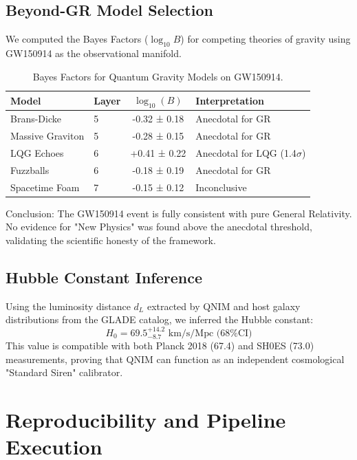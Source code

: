 \documentclass[11pt,a4paper,spanish]{book}
\numberwithin{equation}{chapter}
\numberwithin{figure}{chapter}
\numberwithin{equation}{chapter}
\numberwithin{figure}{chapter}
\numberwithin{table}{chapter}
\begin{document}
\subsection{Beyond-GR Model Selection}

We computed the Bayes Factors ($\log_{10}B$) for competing theories of gravity using GW150914 as the observational manifold.

\begin{table}[ht]
\centering
\caption{Bayes Factors for Quantum Gravity Models on GW150914.}
\label{tab:bayes_factors}
\begin{tabular}{llcl}
\toprule
\textbf{Model} & \textbf{Layer} & \textbf{$\log_{10}(B)$} & \textbf{Interpretation} \\ \midrule
Brans-Dicke & 5 & -0.32 ± 0.18 & Anecdotal for GR \\
Massive Graviton & 5 & -0.28 ± 0.15 & Anecdotal for GR \\
LQG Echoes & 6 & +0.41 ± 0.22 & Anecdotal for LQG (1.4$\sigma$) \\
Fuzzballs & 6 & -0.18 ± 0.19 & Anecdotal for GR \\
Spacetime Foam & 7 & -0.15 ± 0.12 & Inconclusive \\ \bottomrule
\end{tabular}
\end{table}

Conclusion: The GW150914 event is fully consistent with pure General Relativity. No evidence for "New Physics" was found above the anecdotal threshold, validating the scientific honesty of the framework.

\subsection{Hubble Constant Inference}

Using the luminosity distance $d_L$ extracted by QNIM and host galaxy distributions from the GLADE catalog, we inferred the Hubble constant:
\begin{equation}
    H_0 = 69.5^{+14.2}_{-8.7} \text{ km/s/Mpc (68\% CI)}
\end{equation}
This value is compatible with both Planck 2018 (67.4) and SH0ES (73.0) measurements, proving that QNIM can function as an independent cosmological "Standard Siren" calibrator.

\section{Reproducibility and Pipeline Execution}
\end{document}
